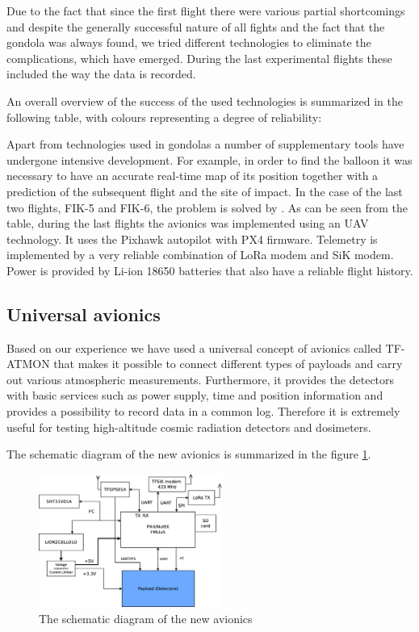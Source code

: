 \documentclass{Rpd}
\begin{document}
Due to the fact that since the first flight there were various partial shortcomings and despite the generally successful nature of all fights and the fact that the gondola was always found, we tried different technologies to eliminate the complications, which have emerged. During the last experimental flights these included the way the data is recorded.

An overall overview of the success of the used technologies is summarized in the following table, with colours representing a degree of reliability:




Apart from technologies used in gondolas a number of supplementary tools have undergone intensive development. For example, in order to find the balloon it was necessary to have an accurate real-time map of its position together with a prediction of the subsequent flight and the site of impact. In the case of the last two flights, FIK-5 and FIK-6, the problem is solved by \cite{habhub_tracker}.
As can be seen from the table, during the last flights the avionics was implemented using an UAV technology. It uses the Pixhawk autopilot with PX4 firmware. Telemetry is implemented by a very reliable combination of LoRa modem and SiK modem. Power is provided by Li-ion 18650 batteries that also have a reliable flight history.



\subsection{Universal avionics}
Based on our experience we have used a universal concept of avionics called TF-ATMON that makes it possible to connect different types of payloads and carry out various atmospheric measurements. Furthermore, it provides the detectors with basic services such as power supply, time and position information and provides a possibility to record data in a common log. Therefore it is extremely useful for testing high-altitude cosmic radiation detectors and dosimeters.

The schematic diagram of the new avionics is summarized in the figure \ref{avionics_schematics}.


\begin{center}
\begin{figure}%
	\centerline{\includegraphics[width=60mm]{img/avionics_block_schematics.eps}}
	\caption{The schematic diagram of the new avionics \label{avionics_schematics}}
\end{figure}
\end{center}
\end{document}
